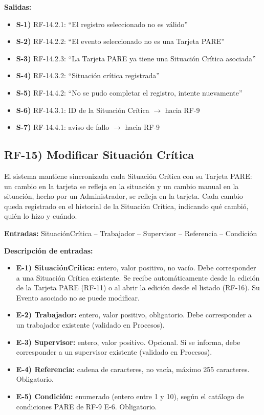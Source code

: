 \textbf{Salidas:}
\begin{itemize}[label={}, leftmargin=1.5em]
  \item \textbf{S-1)} RF-14.2.1: ``El registro seleccionado no es v\'alido''
  \item \textbf{S-2)} RF-14.2.2: ``El evento seleccionado no es una Tarjeta PARE''
  \item \textbf{S-3)} RF-14.2.3: ``La Tarjeta PARE ya tiene una Situaci\'on Cr\'itica asociada''
  \item \textbf{S-4)} RF-14.3.2: ``Situaci\'on cr\'itica registrada''
  \item \textbf{S-5)} RF-14.4.2: ``No se pudo completar el registro, intente nuevamente''
  \item \textbf{S-6)} RF-14.3.1: ID de la Situaci\'on Cr\'itica $\rightarrow$ hacia RF-9
  \item \textbf{S-7)} RF-14.4.1: aviso de fallo $\rightarrow$ hacia RF-9
\end{itemize}

\subsection*{RF-15) Modificar Situaci\'on Cr\'itica}
El sistema mantiene sincronizada cada Situaci\'on Cr\'itica con su Tarjeta PARE: un cambio en la tarjeta se refleja en la situaci\'on y un cambio manual en la situaci\'on, hecho por un Administrador, se refleja en la tarjeta. Cada cambio queda registrado en el historial de la Situaci\'on Cr\'itica, indicando qu\'e cambi\'o, qui\'en lo hizo y cu\'ando.

\textbf{Entradas:} Situaci\'onCr\'itica -- Trabajador -- Supervisor -- Referencia -- Condici\'on

\textbf{Descripci\'on de entradas:}
\begin{itemize}[label={}, leftmargin=1.5em]
  \item \textbf{E-1) Situaci\'onCr\'itica:} entero, valor positivo, no vac\'io. Debe corresponder a una Situaci\'on Cr\'itica existente. Se recibe autom\'aticamente desde la edici\'on de la Tarjeta PARE (RF-11) o al abrir la edici\'on desde el listado (RF-16). Su Evento asociado no se puede modificar.
  \item \textbf{E-2) Trabajador:} entero, valor positivo, obligatorio. Debe corresponder a un trabajador existente (validado en Procesos).
  \item \textbf{E-3) Supervisor:} entero, valor positivo. Opcional. Si se informa, debe corresponder a un supervisor existente (validado en Procesos).
  \item \textbf{E-4) Referencia:} cadena de caracteres, no vac\'ia, m\'aximo 255 caracteres. Obligatorio.
  \item \textbf{E-5) Condici\'on:} enumerado (entero entre 1 y 10), seg\'un el cat\'alogo de condiciones PARE de RF-9 E-6. Obligatorio.
\end{itemize}

